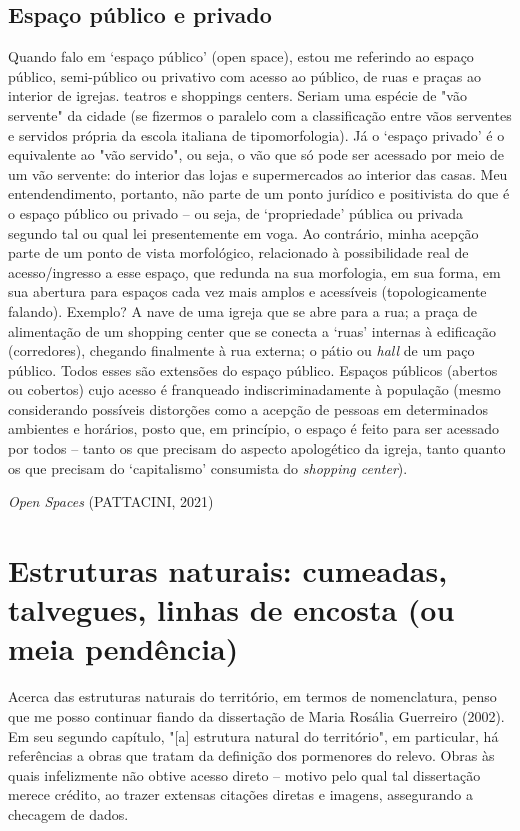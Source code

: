 \documentclass[]{report}
\begin{document}
	\subsection{Espaço público e privado}
	Quando falo em `espaço público' (open space), estou me referindo ao espaço público, semi-público ou privativo com acesso ao público, de ruas e praças ao interior de igrejas. teatros e shoppings centers. Seriam uma espécie de "vão servente" da cidade (se fizermos o paralelo com a classificação entre vãos serventes e servidos própria da escola italiana de tipomorfologia). Já o `espaço privado' é o equivalente ao "vão servido", ou seja, o vão que só pode ser acessado por meio de um vão servente: do interior das lojas e supermercados ao interior das casas. Meu entendendimento, portanto, não parte de um ponto jurídico e positivista do que é o espaço público ou privado – ou seja, de `propriedade' pública ou privada segundo tal ou qual lei presentemente em voga. Ao contrário, minha acepção parte de um ponto de vista morfológico, relacionado à possibilidade real de acesso/ingresso a esse espaço, que redunda na sua morfologia, em sua forma, em sua abertura para espaços cada vez mais amplos e acessíveis (topologicamente falando). Exemplo? A nave de uma igreja que se abre para a rua; a praça de alimentação de um shopping center que se conecta a `ruas' internas à edificação (corredores), chegando finalmente à rua externa; o pátio ou \textit{hall} de um paço público. Todos esses são extensões do espaço público. Espaços públicos (abertos ou cobertos) cujo acesso é franqueado indiscriminadamente à população (mesmo considerando possíveis distorções como a acepção de pessoas em determinados ambientes e horários, posto que, em princípio, o espaço é feito para ser acessado por todos – tanto os que precisam do aspecto apologético da igreja, tanto quanto os que precisam do `capitalismo' consumista do \textit{shopping center}).
	
	\textit{Open Spaces} (PATTACINI, 2021)
	
\section{Estruturas naturais: cumeadas, talvegues, linhas de encosta (ou meia pendência)}

Acerca das estruturas naturais do território, em termos de nomenclatura, penso que me posso continuar fiando da dissertação de Maria Rosália Guerreiro (2002). Em seu segundo capítulo, "[a] estrutura natural do território", em particular, há referências a obras que tratam da definição dos pormenores do relevo. Obras às quais infelizmente não obtive acesso direto – motivo pelo qual tal dissertação merece crédito, ao trazer extensas citações diretas e imagens, assegurando a checagem de dados.
\end{document}

